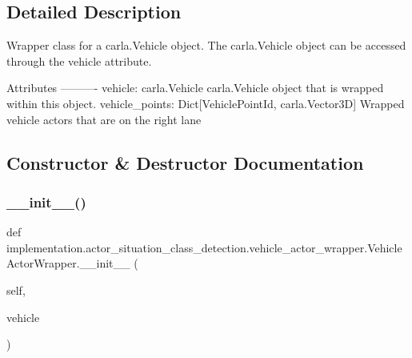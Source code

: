 \subsection{Detailed Description}
\begin{DoxyVerb}Wrapper class for a carla.Vehicle object. The carla.Vehicle object can be accessed through the vehicle attribute.

Attributes
----------
vehicle: carla.Vehicle
    carla.Vehicle object that is wrapped within this object.
vehicle_points: Dict[VehiclePointId, carla.Vector3D]
    Wrapped vehicle actors that are on the right lane\end{DoxyVerb}
 

\subsection{Constructor \& Destructor Documentation}
\mbox{\label{classimplementation_1_1actor__situation__class__detection_1_1vehicle__actor__wrapper_1_1_vehicle_actor_wrapper_ad0583b97d37e7fa415da2c4b3e316696}} 
\subsubsection{\texorpdfstring{\+\_\+\+\_\+init\+\_\+\+\_\+()}{\_\_init\_\_()}}
{\footnotesize\ttfamily def implementation.\+actor\+\_\+situation\+\_\+class\+\_\+detection.\+vehicle\+\_\+actor\+\_\+wrapper.\+Vehicle\+Actor\+Wrapper.\+\_\+\+\_\+init\+\_\+\+\_\+ (\begin{DoxyParamCaption}\item[{}]{self,  }\item[{}]{vehicle }\end{DoxyParamCaption})}



